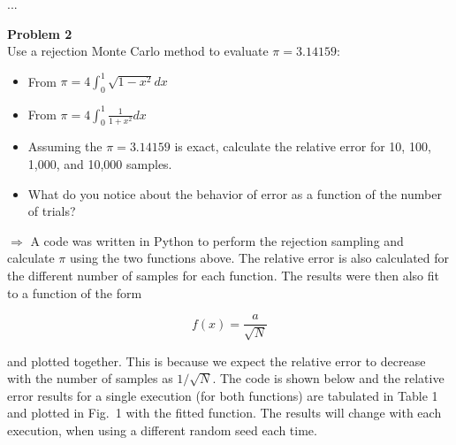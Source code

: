 \documentclass[10pt]{article}
\begin{document}
...

%
%
%

\newpage
\noindent \textbf{Problem 2}\\
Use a rejection Monte Carlo method to evaluate $\pi = 3.14159$:

\begin{itemize}
	\item From $\pi = 4 \int_0^1 \sqrt{1-x^2} dx$
	\item From $\pi = 4 \int_0^1 \frac{1}{1+x^2} dx$
	\item Assuming the $\pi = 3.14159$ is exact, calculate the relative error for 10, 100, 1,000, and 10,000 samples.
	\item What do you notice about the behavior of error as a function of the number of trials?
\end{itemize}

$\Rightarrow$ A code was written in Python to perform the rejection sampling and calculate $\pi$ using the two functions above. The relative error is also calculated for the different number of samples for each function. The results were then also fit to a function of the form

\begin{equation*}
	f(x) = \frac{a}{\sqrt{N}}
\end{equation*}

and plotted together. This is because we expect the relative error to decrease with the number of samples as $1/\sqrt{N}$. The code is shown below and the relative error results for a single execution (for both functions) are tabulated in Table 1 and plotted in Fig.~1 with the fitted function. The results will change with each execution, when using a different random seed each time.\\


\end{document}
